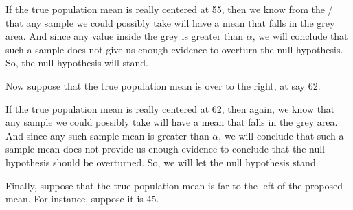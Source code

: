 \documentclass[../../../main.tex]{subfiles}
\begin{document}
\noindent
If the true population mean is really centered at 55, then we know from the \CLT/ that any sample we could possibly take will have a mean that falls in the grey area. And since any value inside the grey is greater than $\alpha$, we will conclude that such a sample does not give us enough evidence to overturn the null hypothesis. So, the null hypothesis will stand.

Now suppose that the true population mean is over to the right, at say 62. 

\begin{center}
\end{center}

\noindent
If the true population mean is really centered at 62, then again, we know that any sample we could possibly take will have a mean that falls in the grey area. And since any such sample mean is greater than $\alpha$, we will conclude that such a sample mean does not provide us enough evidence to conclude that the null hypothesis should be overturned. So, we will let the null hypothesis stand.

Finally, suppose that the true population mean is far to the left of the proposed mean. For instance, suppose it is 45.
\end{document}
